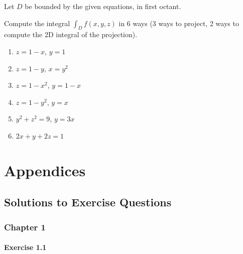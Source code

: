 \documentclass[11pt,fleqn]{book} %
\begin{document}
\begin{example}
    Let $D$ be bounded by the given equations, in first octant. 

    Compute the integral $\int_D f(x, y, z)$ in 6 ways (3 ways to project, 2 ways to compute the 2D integral of the projection). 

    \begin{minipage}[t]{0.45\linewidth}
        \begin{enumerate}
            \item $z = 1 - x$, $y = 1$
            \item $z = 1 - y$, $x = y^2$
            \item $z = 1 - x^2$, $y = 1 - x$
        \end{enumerate}
    \end{minipage}
    \begin{minipage}[t]{0.45\linewidth}
        \begin{enumerate} \setcounter{enumi}{3}
            \item $z = 1 - y^2$, $y = x$
            \item $y^2 + z^2 = 9$, $y = 3x$
            \item $2x + y + 2z = 1$
        \end{enumerate}
    \end{minipage}
\end{example}


\part{Appendices}


\chapter*{Solutions to Exercise Questions}
\setlength{\parindent}{0pt} %

\section*{Chapter 1}

\subsection*{Exercise 1.1}
\end{document}
